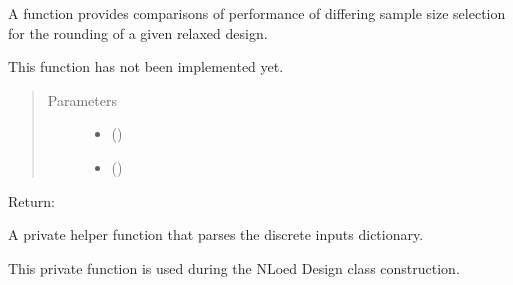 \documentclass[letterpaper,10pt,english,openany,oneside]{sphinxmanual}
\begin{document}
\begin{fulllineitems}
\begin{fulllineitems}
\label{\detokenize{nloed:nloed.design.Design.power}}
A function provides comparisons of performance of differing sample size selection for
the rounding of a given relaxed design.

This function has not been implemented yet.
\begin{quote}\begin{description}
\item[{Parameters}] \leavevmode\begin{itemize}
\item {} 
 () \textendash{} 

\item {} 
 () \textendash{} 

\end{itemize}

\end{description}\end{quote}

Return:

\end{fulllineitems}


\begin{fulllineitems}
\label{\detokenize{nloed:nloed.design.Design.__discrete_settup}}
A private helper function that parses the discrete inputs dictionary.

This private function is used during the NLoed Design class construction.


\end{fulllineitems}
\end{fulllineitems}
\end{document}
